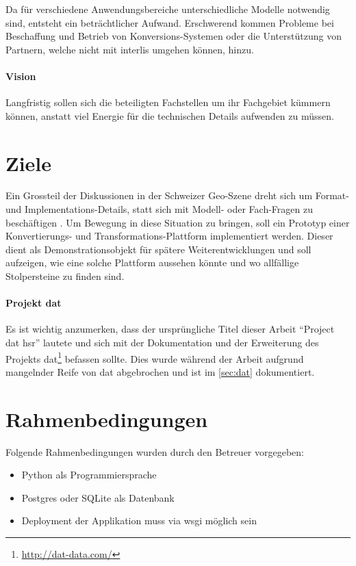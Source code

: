 Da für verschiedene Anwendungsbereiche unterschiedliche Modelle notwendig sind, entsteht ein beträchtlicher Aufwand. Erschwerend kommen Probleme bei Beschaffung und Betrieb von Konversions-Systemen oder die Unterstützung von Partnern, welche nicht mit \gls{interlis} umgehen können, hinzu.

\paragraph{Vision}
Langfristig sollen sich die beteiligten Fachstellen um ihr Fachgebiet kümmern können, anstatt viel Energie für die technischen Details aufwenden zu müssen. 

\section{Ziele}
Ein Grossteil der Diskussionen in der Schweizer Geo-Szene dreht sich um Format- und Implementations-Details, statt sich mit Modell- oder Fach-Fragen zu beschäftigen \cite{sfkeller}. Um Bewegung in diese Situation zu bringen, soll ein Prototyp einer Konvertierungs- und Transformations-Plattform implementiert werden. Dieser dient als Demonstrationsobjekt für spätere Weiterentwicklungen und soll aufzeigen, wie eine solche Plattform aussehen könnte und wo allfällige Stolpersteine zu finden sind.

\paragraph{Projekt dat}
Es ist wichtig anzumerken, dass der ursprüngliche Titel dieser Arbeit ``Project dat \acs{hsr}'' lautete und sich mit der Dokumentation und der Erweiterung des Projekts dat\footnote{\url{http://dat-data.com/}} befassen sollte. Dies wurde während der Arbeit aufgrund mangelnder Reife von \gls{dat} abgebrochen und ist im \vref{sec:dat} dokumentiert.

\section{Rahmenbedingungen}

Folgende Rahmenbedingungen wurden durch den Betreuer \cite{sfkeller} vorgegeben:

\begin{itemize}
\item Python als Programmiersprache
\item Postgres oder SQLite als Datenbank
\item Deployment der Applikation muss via \gls{wsgi} möglich sein
\end{itemize}

